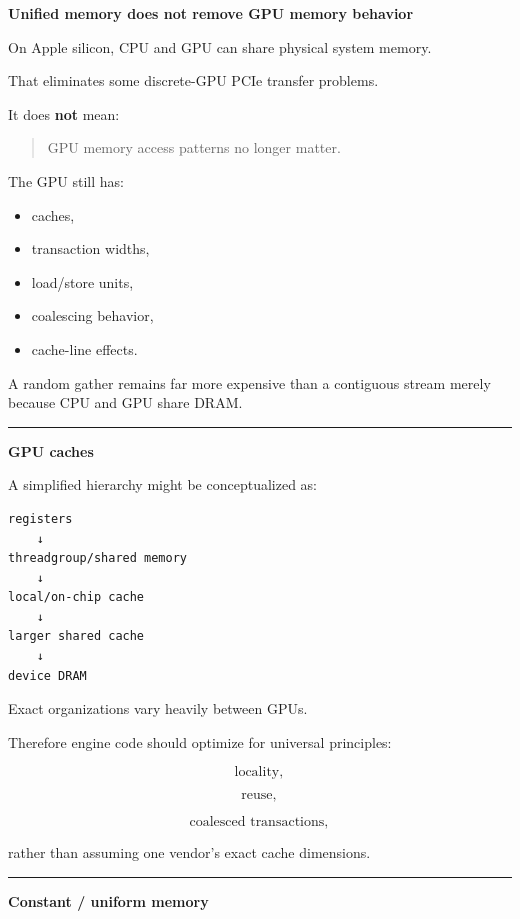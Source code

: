 \textbf{Unified memory does not remove GPU memory behavior}

On Apple silicon, CPU and GPU can share physical system memory.

That eliminates some discrete-GPU PCIe transfer problems.

It does \textbf{not} mean:

\begin{quote}
GPU memory access patterns no longer matter.
\end{quote}

The GPU still has:

\begin{itemize}
\tightlist
\item
  caches,
\item
  transaction widths,
\item
  load/store units,
\item
  coalescing behavior,
\item
  cache-line effects.
\end{itemize}

A random gather remains far more expensive than a contiguous stream merely because CPU and GPU share DRAM.

\begin{center}\rule{0.5\linewidth}{0.5pt}\end{center}

\textbf{GPU caches}

A simplified hierarchy might be conceptualized as:

\protect{}\label{q2nq6h}%
\begin{verbatim}
registers
    ↓
threadgroup/shared memory
    ↓
local/on-chip cache
    ↓
larger shared cache
    ↓
device DRAM
\end{verbatim}

Exact organizations vary heavily between GPUs.

Therefore engine code should optimize for universal principles:

\[
\text{locality},
\]

\[
\text{reuse},
\]

\[
\text{coalesced transactions},
\]

rather than assuming one vendor's exact cache dimensions.

\begin{center}\rule{0.5\linewidth}{0.5pt}\end{center}

\textbf{Constant / uniform memory}

